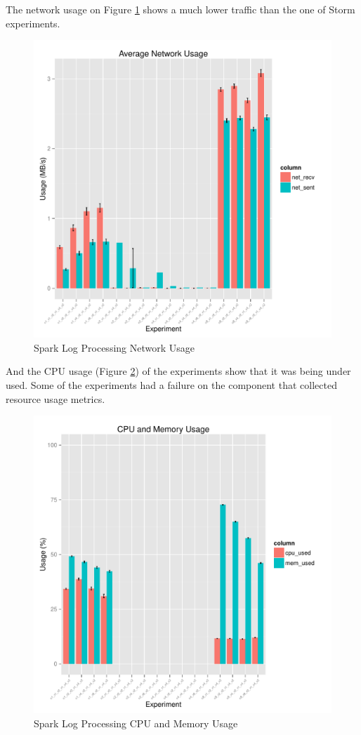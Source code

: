 \documentclass[ppgc,diss,english]{iiufrgs}
\begin{document}
The network usage on Figure \ref{fig:spark_logprocessing_network} shows a much lower traffic than the one of Storm experiments.

\begin{figure}[H]
    \centering
	\includegraphics[width=.6\textwidth]{summaries/spark_logprocessing/network.pdf}
	\caption{Spark Log Processing Network Usage}
	\label{fig:spark_logprocessing_network}
\end{figure}

And the CPU usage (Figure \ref{fig:spark_logprocessing_cpu_mem}) of the experiments show that it was being under used. Some of the experiments had a failure on the component that collected resource usage metrics.

\begin{figure}[H]
    \centering
	\includegraphics[width=.6\textwidth]{summaries/spark_logprocessing/cpu_mem.pdf}
	\caption{Spark Log Processing CPU and Memory Usage}
	\label{fig:spark_logprocessing_cpu_mem}
\end{figure}
\end{document}
